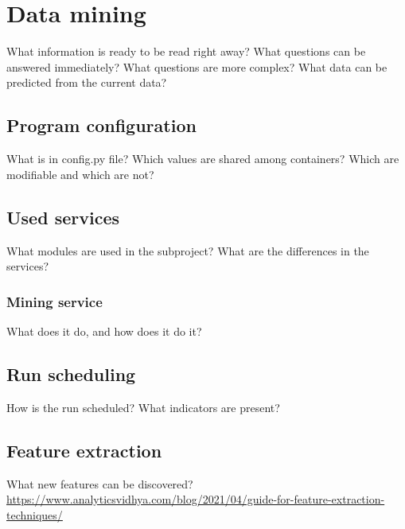 \chapter{Data mining}
\label{ch:mining}
What information is ready to be read right away?
What questions can be answered immediately?
What questions are more complex?
What data can be predicted from the current data?


\section{Program configuration}
What is in config.py file?
Which values are shared among containers?
Which are modifiable and which are not?


\section{Used services}
What modules are used in the subproject?
What are the differences in the services?

\subsection{Mining service}
What does it do, and how does it do it?


\section{Run scheduling}
How is the run scheduled? What indicators are present?


\section{Feature extraction}
What new features can be discovered?
\url{https://www.analyticsvidhya.com/blog/2021/04/guide-for-feature-extraction-techniques/}